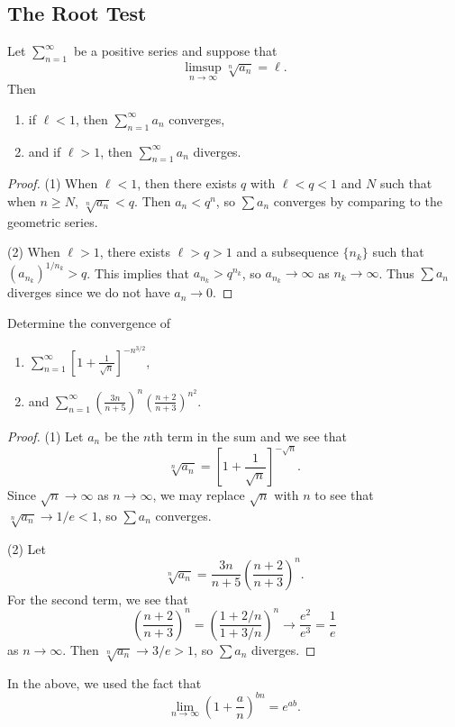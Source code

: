 \subsection{The Root Test}
\begin{theorem}
  Let $\sum_{n = 1}^\infty$ be a positive series and
  suppose that
  \[\limsup_{n \to \infty} \sqrt[n]{a_n} = \ell.\]
  Then
  \begin{enumerate}
    \item if $\ell < 1$, then $\sum_{n = 1}^\infty a_n$ converges,
    \item and if $\ell > 1$, then $\sum_{n = 1}^\infty a_n$ diverges.
  \end{enumerate}
\end{theorem}

\begin{proof}
  (1) When $\ell < 1$, then there exists $q$ with
  $\ell < q < 1$ and $N$ such that when $n \ge N$,
  $\sqrt[n]{a_n} < q$. Then $a_n < q^n$,
  so $\sum a_n$ converges by comparing to the
  geometric series.

  (2) When $\ell > 1$, there exists $\ell > q > 1$ and
  a subsequence $\{n_k\}$ such that
  $(a_{n_k})^{1 / n_k} > q$. This implies that
  $a_{n_k} > q^{n_k}$, so $a_{n_k} \to \infty$ as
  $n_k \to \infty$. Thus $\sum a_n$ diverges since
  we do not have $a_n \to 0$.
\end{proof}

\begin{example}
  Determine the convergence of
  \begin{enumerate}
    \item $\displaystyle \sum_{n =1 }^\infty \left[1 + \frac{1}{\sqrt{n}}\right]^{-n^{3 / 2}}$,
    \item and $\displaystyle \sum_{n = 1}^\infty \left(\frac{3n}{n + 5}\right)^n \left(\frac{n + 2}{n + 3}\right)^{n^2}$.
  \end{enumerate}
\end{example}

\begin{proof}
  (1) Let $a_n$ be the $n$th term in the sum and we
  see that
  \[
    \sqrt[n]{a_n} =
    \left[1 + \frac{1}{\sqrt{n}}\right]^{-\sqrt{n}}.
  \]
  Since $\sqrt{n} \to \infty$ as $n \to \infty$, we
  may replace $\sqrt{n}$ with $n$ to see that
  $\sqrt[n]{a_n} \to 1 / e < 1$, so
  $\sum a_n$ converges.

  (2) Let
  \[
    \sqrt[n]{a_n} = \frac{3n}{n + 5} \left(\frac{n + 2}{n + 3}\right)^n.
  \]
  For the second term, we see that
  \[
    \left(\frac{n + 2}{n + 3}\right)^n
    = \left(\frac{1 + 2 / n}{1 + 3 / n}\right)^n
    \longrightarrow \frac{e^2}{e^3} = \frac{1}{e}
  \]
  as $n \to \infty$.
  Then $\sqrt[n]{a_n} \to 3 / e > 1$, so
  $\sum a_n$ diverges.
\end{proof}

\begin{remark}
  In the above, we used the fact that
  \[
    \lim_{n \to \infty} \left(1 + \frac{a}{n}\right)^{bn}
    = e^{ab}.
  \]
\end{remark}
